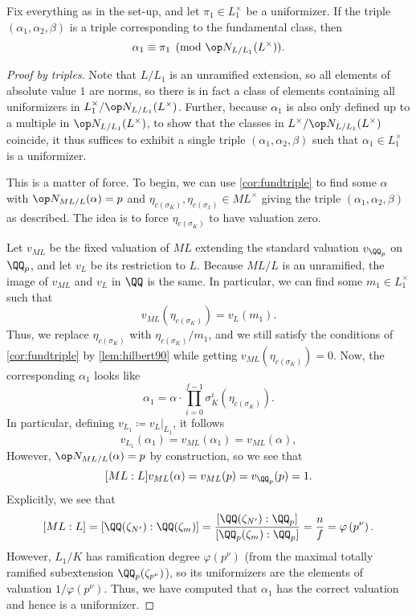 \begin{corollary} \label{cor:classofa1}
	Fix everything as in the set-up, and let $\pi_1\in L_1^\times$ be a uniformizer. If the triple $(\alpha_1,\alpha_2,\beta)$ is a triple corresponding to the fundamental class, then
	\[\alpha_1\equiv\pi_1\pmod{\op N_{L/L_1}(L^\times)}.\]
\end{corollary}
\begin{proof}[Proof by triples]
	Note that $L/L_1$ is an unramified extension, so all elements of absolute value $1$ are norms, so there is in fact a class of elements containing all uniformizers in $L_1^\times/\op N_{L/L_1}(L^\times)$. Further, because $\alpha_1$ is also only defined up to a multiple in $\op N_{L/L_1}(L^\times)$, to show that the classes in $L^\times/\op N_{L/L_1}(L^\times)$ coincide, it thus suffices to exhibit a single triple $(\alpha_1,\alpha_2,\beta)$ such that $\alpha_1\in L_1^\times$ is a uniformizer.

	This is a matter of force. To begin, we can use \autoref{cor:fundtriple} to find some $\alpha$ with $\op N_{ML/L}(\alpha)=p$ and $\eta_{c(\sigma_K)},\eta_{c(\sigma_x)}\in ML^\times$ giving the triple $(\alpha_1,\alpha_2,\beta)$ as described. The idea is to force $\eta_{c(\sigma_K)}$ to have valuation zero.
	
	Let $v_{ML}$ be the fixed valuation of $ML$ extending the standard valuation $v_{\QQ_p}$ on $\QQ_p$, and let $v_{L}$ be its restriction to $L$. Because $ML/L$ is an unramified, the image of $v_{ML}$ and $v_L$ in $\QQ$ is the same. In particular, we can find some $m_1\in L_1^\times$ such that
	\[v_{ML}\left(\eta_{c(\sigma_K)}\right)=v_L(m_1).\]
	Thus, we replace $\eta_{c(\sigma_K)}$ with $\eta_{c(\sigma_K)}/m_1$, and we still satisfy the conditions of \autoref{cor:fundtriple} by \autoref{lem:hilbert90} while getting $v_{ML}\left(\eta_{c(\sigma_K)}\right)=0$. Now, the corresponding $\alpha_1$ looks like
	\[\alpha_1=\alpha\cdot\prod_{i=0}^{f-1}\sigma_K^i\left(\eta_{c(\sigma_K)}\right).\]
	In particular, defining $v_{L_1}\coloneqq v_L|_{L_1}$, it follows
	\[v_{L_1}(\alpha_1)=v_{ML}(\alpha_1)=v_{ML}(\alpha),\]
	However, $\op N_{ML/L}(\alpha)=p$ by construction, so we see that
	\[[ML:L]v_{ML}(\alpha)=v_{ML}(p)=v_{\QQ_p}(p)=1.\]
	Explicitly, we see that
	\[[ML:L]=[\QQ(\zeta_{N'}):\QQ(\zeta_m)]=\frac{[\QQ(\zeta_{N'}):\QQ_p]}{[\QQ_p(\zeta_m):\QQ_p]}=\frac nf=\varphi\left(p^\nu\right).\]
	However, $L_1/K$ has ramification degree $\varphi\left(p^\nu\right)$ (from the maximal totally ramified subextension $\QQ_p(\zeta_{p^\nu})$), so its uniformizers are the elements of valuation $1/\varphi\left(p^\nu\right)$. Thus, we have computed that $\alpha_1$ has the correct valuation and hence is a uniformizer.
\end{proof}
